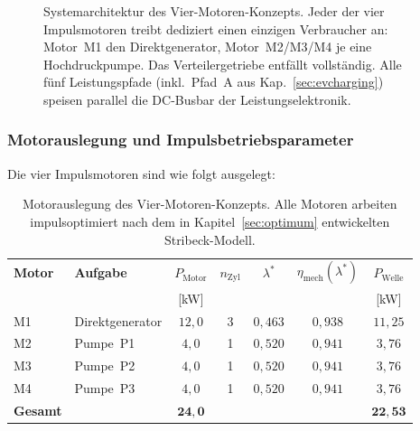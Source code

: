 ﻿\documentclass[a4paper,12pt]{article}
\begin{document}
\begin{figure}
  \caption{Systemarchitektur des Vier-Motoren-Konzepts. Jeder der
    vier Impulsmotoren treibt dediziert einen einzigen Verbraucher an:
    Motor~M1 den Direktgenerator, Motor~M2/M3/M4 je eine Hochdruckpumpe.
    Das Verteilergetriebe entfällt vollständig. Alle fünf Leistungspfade
    (inkl.\ Pfad~A aus Kap.~\ref{sec:evcharging}) speisen parallel die
    DC-Busbar der Leistungselektronik.}
  \label{fig:vier_motoren}
\end{figure}

\subsubsection{Motorauslegung und Impulsbetriebsparameter}

Die vier Impulsmotoren sind wie folgt ausgelegt:

\begin{table}[htbp]
  \centering
  \caption{Motorauslegung des Vier-Motoren-Konzepts.
    Alle Motoren arbeiten impulsoptimiert nach dem in
    Kapitel~\ref{sec:optimum} entwickelten Stribeck-Modell.}
  \label{tab:vier_motoren_auslegung}
  \begin{tabular}{llccccc}
    \toprule
    \textbf{Motor} &
    \textbf{Aufgabe} &
    $P_\text{Motor}$ &
    $n_\text{Zyl}$ &
    $\lambda^*$ &
    $\eta_\text{mech}(\lambda^*)$ &
    $P_\text{Welle}$ \\
    & & [kW] & & & & [kW] \\
    \midrule
    M1 & Direktgenerator & $12{,}0$ & 3 & $0{,}463$ & $0{,}938$ & $11{,}25$ \\
    M2 & Pumpe~P1         & $4{,}0$  & 1 & $0{,}520$ & $0{,}941$ & $3{,}76$  \\
    M3 & Pumpe~P2         & $4{,}0$  & 1 & $0{,}520$ & $0{,}941$ & $3{,}76$  \\
    M4 & Pumpe~P3         & $4{,}0$  & 1 & $0{,}520$ & $0{,}941$ & $3{,}76$  \\
    \midrule
    \textbf{Gesamt} & & $\mathbf{24{,}0}$ & & & & $\mathbf{22{,}53}$ \\
    \bottomrule
  \end{tabular}
\end{table}
\end{document}
